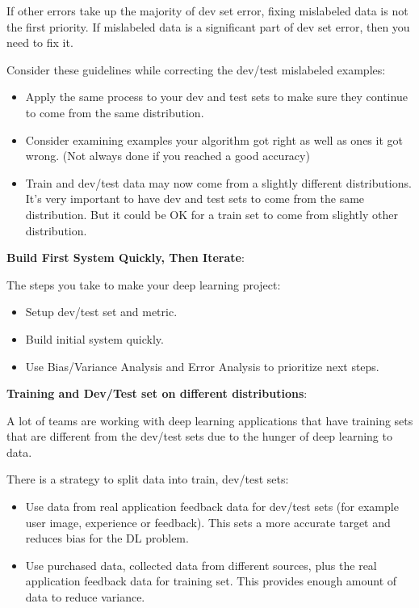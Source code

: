 \documentclass{article}
\begin{document}
\noindent If other errors take up the majority of dev set error, fixing mislabeled data is not the first priority. If mislabeled data is a significant part of dev set error, then you need to fix it.

\bigskip

\noindent Consider these guidelines while correcting the dev/test mislabeled examples:

\begin{itemize}
    \item Apply the same process to your dev and test sets to make sure they continue to come from the same distribution.
    \item Consider examining examples your algorithm got right as well as ones it got wrong. (Not always done if you reached a good accuracy)
    \item Train and dev/test data may now come from a slightly different distributions. It's very important to have dev and test sets to come from the same distribution. But it could be OK for a train set to come from slightly other distribution.
\end{itemize}

\noindent \textbf{Build First System Quickly, Then Iterate}:

\noindent The steps you take to make your deep learning project:

\begin{itemize}
    \item Setup dev/test set and metric.
    \item Build initial system quickly.
    \item Use Bias/Variance Analysis and Error Analysis to prioritize next steps.
\end{itemize}

\noindent \textbf{Training and Dev/Test set on different distributions}:

\noindent A lot of teams are working with deep learning applications that have training sets that are different from the dev/test sets due to the hunger of deep learning to data.

\bigskip

\noindent There is a strategy to split data into train, dev/test sets:

\begin{itemize}
    \item Use data from real application feedback data for dev/test sets (for example user image, experience or feedback). This sets a more accurate target and reduces bias for the DL problem.
    \item Use purchased data, collected data from different sources, plus the real application feedback data for training set. This provides enough amount of data to reduce variance.
\end{itemize}
\end{document}
